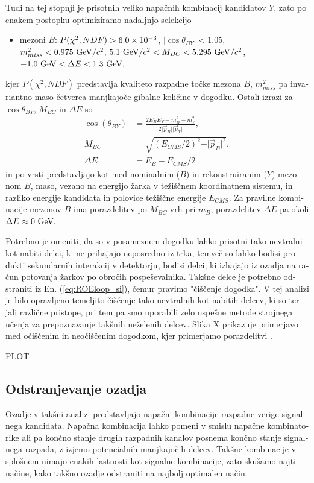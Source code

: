 \begin{otherlanguage}{slovene}
Tudi na tej stopnji je prisotnih veliko napačnih kombinacij kandidatov $Y$, zato po enakem postopku optimiziramo nadaljnjo selekcijo
\begin{itemize}
\item mezoni $B$: $P(\chi^2,NDF) > 6.0\times 10^{-3}$, $\vert \cos \theta_{BY} \vert < 1.05$, $m_{miss}^2 < 0.975\mathrm{~GeV}/c^2$, $5.1\mathrm{~GeV}/c^2 < M_{BC} < 5.295\mathrm{~GeV}/c^2$, $-1.0\mathrm{~GeV} < \Delta E < 1.3\mathrm{~GeV},$
\end{itemize}
kjer $P(\chi^2,NDF)$ predstavlja kvaliteto razpadne točke mezona $B$, $m_{miss}^2$ pa invariantno maso četverca manjkajoče gibalne količine v dogodku. Ostali izrazi za $\cos \theta_{BY}$, $M_{BC}$ in $\Delta E$ so
\begin{align}
\cos \left(\theta_{BY}\right) &= \frac{2E_BE_Y - m_B^2 - m_Y^2}{2\vert \vec{p}_B \vert \vert \vec{p}_Y\vert},\\
M_{BC} &= \sqrt{\left(E_{CMS}/2\right)^2 - \vert \vec{p}_B \vert^2},\\
\Delta E &= E_B - E_{CMS}/2
\end{align}
in po vrsti predstavljajo kot med nominalnim ($B$) in rekonstruiranim ($Y$) mezonom $B$, maso, vezano na energijo žarka v težiščnem koordinatnem sistemu, in razliko energije kandidata in polovice težiščne energije $E_{CMS}$. Za pravilne kombinacije mezonov $B$ ima porazdelitev po $M_{BC}$ vrh pri $m_B$, porazdelitev $\Delta E$ pa okoli $\Delta E \approx 0\mathrm{~GeV}.$

Potrebno je omeniti, da so v posameznem dogodku lahko prisotni tako nevtralni kot nabiti delci, ki ne prihajajo neposredno iz trka, temveč so lahko bodisi produkti sekundarnih interakcij v detektorju, bodisi delci, ki izhajajo iz ozadja na račun potovanja žarkov po obročih pospeševalnika. Takšne delce je potrebno odstraniti iz En. (\ref{eq:ROEloop_si}), čemur pravimo "čiščenje dogodka". V tej analizi je bilo opravljeno temeljito čiščenje tako nevtralnih kot nabitih delcev, ki so terjali različne pristope, pri tem pa smo uporabili zelo uspešne metode strojnega učenja za prepoznavanje takšnih neželenih delcev. Slika X prikazuje primerjavo med očiščenim in neočiščenim dogodkom, kjer primerjamo porazdelitvi \vars.

PLOT

\subsection{Odstranjevanje ozadja}

Ozadje v takšni analizi predstavljajo napačni kombinacije razpadne verige signalnega kandidata. Napačna kombinacija lahko pomeni v smislu napačne kombinatorike ali pa končno stanje drugih razpadnih kanalov posnema končno stanje signalnega razpada, z izjemo potencialnih manjkajočih delcev. Takšne kombinacije v splošnem nimajo enakih lastnosti kot signalne kombinacije, zato skušamo najti načine, kako takšno ozadje odstraniti na najbolj optimalen način.


\end{otherlanguage}
